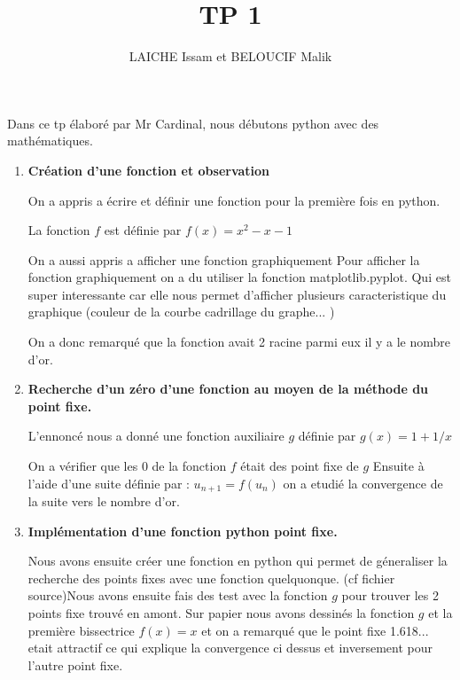 \documentclass{article}
\title{TP 1}
\author{LAICHE Issam et BELOUCIF Malik}
\begin{document}
\maketitle

Dans ce tp élaboré par Mr Cardinal, nous débutons python avec des mathématiques.\newline

\begin{enumerate}

\item{\bf Création d'une fonction et observation}
	
On a appris a écrire et définir une fonction pour la première fois en python.

La fonction $f$ est définie par $f(x) = x^2-x-1$


On a aussi appris a afficher une fonction graphiquement
Pour afficher la fonction graphiquement on a du utiliser la fonction matplotlib.pyplot. Qui est super interessante car elle nous permet d'afficher plusieurs caracteristique du graphique (couleur de la courbe cadrillage du graphe... )\newline

On a donc remarqué que la fonction avait 2 racine parmi eux il y a le nombre d'or.\newline


\item{\bf Recherche d’un zéro d’une fonction au moyen de la méthode du point fixe.}

L'ennoncé nous a donné une fonction auxiliaire $g$ définie par $g(x) = 1+1/x$

On a vérifier que les 0 de la fonction $f$ était des point fixe de $g$\newline
Ensuite à l'aide d'une suite définie par : $u_{n+1}=f(u_n)$ on a etudié la convergence de la suite vers le nombre d'or.\newline

\item{\bf Implémentation d’une fonction python point fixe.}

Nous avons ensuite créer une fonction en python qui permet de géneraliser la recherche des points fixes avec une fonction quelquonque. (cf fichier source)\newline Nous avons ensuite fais des test avec la fonction $g$ pour trouver les 2 points fixe trouvé en amont.
\newline Sur papier nous avons dessinés la fonction $g$ et la première bissectrice $f(x)=x$
 et on a remarqué que le point fixe 1.618... etait attractif ce qui explique la convergence ci dessus et inversement pour l'autre point fixe.\newline


\end{enumerate}
\end{document}
